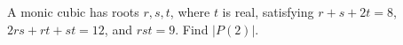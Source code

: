 A monic cubic has roots $r,s,t$, where $t$ is real, satisfying $r+s+2t=8$, $2rs+rt+st=12$, and $rst=9$. Find $|P(2)|$.
